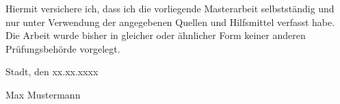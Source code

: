 
Hiermit versichere ich, dass ich die vorliegende Masterarbeit selbstständig und nur unter
Verwendung der angegebenen Quellen und Hilfsmittel verfasst habe. Die Arbeit wurde bisher
in gleicher oder ähnlicher Form keiner anderen Prüfungsbehörde vorgelegt.

\vskip 1cm

Stadt, den xx.xx.xxxx

\vskip 1.5cm

Max Mustermann